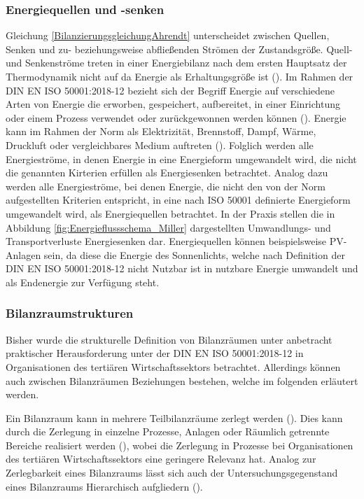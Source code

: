 
\subsubsection{Energiequellen und -senken}
Gleichung \eqref{BilanzierungsgleichungAhrendt} unterscheidet zwischen Quellen, Senken und zu- beziehungsweise abfließenden Strömen der Zustandsgröße. 
Quell- und Senkenströme treten in einer Energiebilanz nach dem ersten Hauptsatz der Thermodynamik nicht auf da Energie als Erhaltungsgröße ist (\cite[S. 14]{Ahrendts.2014}). 
Im Rahmen der DIN EN ISO 50001:2018-12 bezieht sich der Begriff Energie auf verschiedene Arten von Energie die erworben, gespeichert, aufbereitet, in einer Einrichtung oder einem Prozess verwendet 
oder zurückgewonnen werden können (\cite[Kapitel 3.5.1]{DIN50001.2018}). Energie kann im Rahmen der Norm als Elektrizität, Brennstoff, Dampf, Wärme, Druckluft oder vergleichbares Medium auftreten 
(\cite[Kapitel 3.5.1]{DIN50001.2018}).
Folglich werden alle Energieströme, in denen Energie in eine Energieform umgewandelt wird, die nicht die genannten Kirterien erfüllen als Energiesenken betrachtet. 
Analog dazu werden alle Energieströme, bei denen Energie, die nicht den von der Norm aufgestellten Kriterien entspricht, in eine nach ISO 50001 definierte Energieform 
umgewandelt wird, als Energiequellen betrachtet.
In der Praxis stellen die in Abbildung \eqref{fig:Energieflussschema_Miller} dargestellten Umwandlungs- und Transportverluste Energiesenken dar. Energiequellen können beispielsweise 
PV-Anlagen sein, da diese die Energie des Sonnenlichts, welche nach Definition der DIN EN ISO 50001:2018-12 nicht Nutzbar ist in nutzbare Energie umwandelt und als 
Endenergie zur Verfügung steht.

\subsubsection{Bilanzraumstrukturen}
Bisher wurde die strukturelle Definition von Bilanzräumen unter anbetracht praktischer Herausforderung unter der DIN EN ISO 50001:2018-12 in Organisationen 
des tertiären Wirtschaftssektors betrachtet. Allerdings können auch zwischen Bilanzräumen Beziehungen bestehen, welche im folgenden erläutert werden.

Ein Bilanzraum kann in mehrere Teilbilanzräume zerlegt werden (\cite[S. 310]{Engelmann.2015}). Dies kann durch die Zerlegung in einzelne Prozesse, 
Anlagen oder Räumlich getrennte Bereiche realisiert werden (\cite[S. 310]{Engelmann.2015}), wobei die Zerlegung in Prozesse bei Organisationen des tertiären 
Wirtschaftssektors eine geringere Relevanz hat.
Analog zur Zerlegbarkeit eines Bilanzraums lässt sich auch der Untersuchungsgegenstand eines Bilanzraums Hierarchisch aufgliedern (\cite[S. 109]{Miller.2016}).

